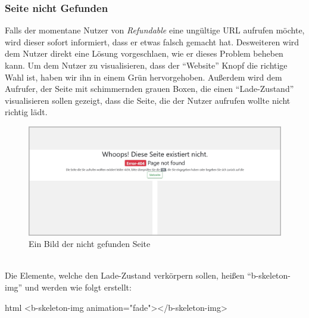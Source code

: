 \subsubsection{Seite nicht Gefunden}
\label{chapter:implementierung-frontend-komponenten-notfound}
Falls der momentane Nutzer von \textit{Refundable} eine ungültige URL aufrufen möchte, wird dieser sofort informiert, dass er etwas falsch gemacht hat. Desweiteren wird dem Nutzer direkt eine Lösung vorgeschlaen, wie er dieses Problem beheben kann. Um dem Nutzer zu visualisieren, dass der \enquote{Website} Knopf die richtige Wahl ist, haben wir ihn in einem Grün hervorgehoben. Außerdem wird dem Aufrufer, der Seite mit schimmernden grauen Boxen, die einen \enquote{Lade-Zustand} visualisieren sollen gezeigt, dass die Seite, die der Nutzer aufrufen wollte nicht richtig lädt.
\begin{figure}[H]
	\centering
	\includegraphics[width=1\linewidth]{images/ldehner_implementierung/notfound}
	\caption[Nicht gefunden Seite]{Ein Bild der nicht gefunden Seite}
	\label{fig:notfoundsite}
\end{figure}
~\\
Die Elemente, welche den Lade-Zustand verkörpern sollen, heißen \enquote{b-skeleton-img} und werden wie folgt erstellt:
\begin{code}{html}
	<b-skeleton-img animation="fade"></b-skeleton-img>
\end{code}
	\label{list:codeskeleton} ~\\

\newpage

